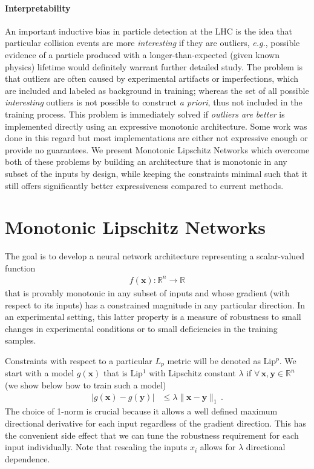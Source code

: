 \documentclass{article}
\begin{document}
\paragraph{Interpretability} An important inductive bias in particle detection at the LHC is the idea that particular collision events are more {\em interesting} if they are outliers, {\em e.g.}, possible evidence of a particle produced with a longer-than-expected (given known physics) lifetime would definitely warrant further detailed study. The problem is that outliers are often caused by experimental artifacts or imperfections, which are included and labeled as background in training; whereas the set of all possible {\em interesting} outliers is not possible to construct {\em a priori}, thus not included in the training process. 
This problem is immediately solved if {\em outliers are better} is implemented directly using an expressive monotonic architecture. Some work was done in this regard \cite{liu2020certified, you2017deepLattice, nips93monotonic} but most implementations are either not expressive enough or provide no guarantees. 
We present Monotonic Lipschitz Networks which overcome both of these problems by building an architecture that is monotonic in any subset of the inputs by design, while keeping the constraints minimal such that it still offers significantly better expressiveness compared to current methods.


\section{Monotonic Lipschitz Networks}
\label{sec:LipNN}
The goal is to develop a neural network architecture representing a scalar-valued function
\begin{align}
f(\bm{x}) : \mathbb{R}^n \rightarrow \mathbb{R}
\end{align}
that is provably monotonic in any subset of inputs and whose gradient (with respect to its inputs) has a constrained magnitude in any particular direction. In an experimental setting, this latter property is a measure of robustness to small changes in experimental conditions or to small deficiencies in the training samples.

Constraints with respect to a particular $L_p$ metric will be denoted as Lip$^p$.
We start with a model $g(\bm{x})$ that is Lip$^1$ with Lipschitz constant $\lambda$ if $\forall \, \bm{x}, \bm{y} \in \mathbb{R}^n$  (we show below how to train such a model)
\begin{align} \label{sigma_lipschitz}
|g(\bm{x}) - g(\bm{y})| &\leq \lambda\|\bm{x} - \bm{y}\|_{1} \,.
\end{align}
The choice of 1-norm is crucial because it allows a well defined maximum directional derivative for each input regardless of the gradient direction. This has the convenient side effect that we can tune the robustness requirement for each input individually.
Note that rescaling the inputs $x_i$ allows for $\lambda$ directional dependence. 
\end{document}
